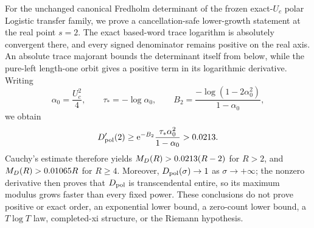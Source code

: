For the unchanged canonical Fredholm determinant of the frozen exact-\(U_c\)
polar Logistic transfer family, we prove a cancellation-safe lower-growth
statement at the real point \(s=2\).  The exact based-word trace logarithm is
absolutely convergent there, and every signed denominator remains positive on
the real axis.  An absolute trace majorant bounds the determinant itself from
below, while the pure-left length-one orbit gives a positive term in its
logarithmic derivative.  Writing
\[
 \alpha_0=\frac{U_c^2}{4},\qquad
 \tau_*=-\log\alpha_0,\qquad
 B_2=\frac{-\log(1-2\alpha_0^2)}{1-\alpha_0},
\]
we obtain
\[
 D_{\mathrm{pol}}'(2)\ge
 \mathrm e^{-B_2}\frac{\tau_*\alpha_0^2}{1-\alpha_0}
 >0.0213.
\]
Cauchy's estimate therefore yields
\(M_D(R)>0.0213(R-2)\) for \(R>2\), and
\(M_D(R)>0.01065R\) for \(R\ge4\).  Moreover,
\(D_{\mathrm{pol}}(\sigma)\to1\) as \(\sigma\to+\infty\); the nonzero derivative then
proves that \(D_{\mathrm{pol}}\) is transcendental entire, so its maximum modulus grows
faster than every fixed power.  These conclusions do not prove positive or
exact order, an exponential lower bound, a zero-count lower bound, a
\(T\log T\) law, completed-xi structure, or the Riemann hypothesis.
